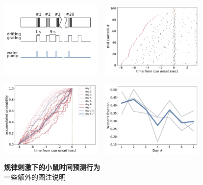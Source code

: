 \begin{figure}[h]
    \begin{center}

    \includegraphics[width=0.45\textwidth]{src/figures/mouse_behavior_schema.pdf}
    ~
    \includegraphics[width=0.45\textwidth]{src/figures/mouse_behavior_example.pdf}

    \includegraphics[width=0.45\textwidth]{src/figures/mouse_behavior_curve.pdf}
    ~
    \includegraphics[width=0.45\textwidth]{src/figures/mouse_behavior_weber.pdf}
    \end{center}

    \caption{\textbf{规律刺激下的小鼠时间预测行为}\\
    一些额外的图注说明}
    \label{fig:mouse_behavior}
\end{figure}

